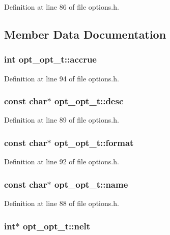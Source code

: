 Definition at line 86 of file options.h.

\subsection{Member Data Documentation}
\subsubsection[{accrue}]{\setlength{\rightskip}{0pt plus 5cm}int {\bf opt\_\-opt\_\-t::accrue}}\label{structopt__opt__t_1e4f71c9392ad7eee4603ad7ce7fe5a0}




Definition at line 94 of file options.h.
\subsubsection[{desc}]{\setlength{\rightskip}{0pt plus 5cm}const char$\ast$ {\bf opt\_\-opt\_\-t::desc}}\label{structopt__opt__t_8f7d53f1fe3aeb96745275446dc5406c}




Definition at line 89 of file options.h.
\subsubsection[{format}]{\setlength{\rightskip}{0pt plus 5cm}const char$\ast$ {\bf opt\_\-opt\_\-t::format}}\label{structopt__opt__t_b91762ff050fe1164dcd1cccc55efb67}




Definition at line 92 of file options.h.
\subsubsection[{name}]{\setlength{\rightskip}{0pt plus 5cm}const char$\ast$ {\bf opt\_\-opt\_\-t::name}}\label{structopt__opt__t_f3e4b9a7e93b947ec1663a98d787cd84}




Definition at line 88 of file options.h.
\subsubsection[{nelt}]{\setlength{\rightskip}{0pt plus 5cm}int$\ast$ {\bf opt\_\-opt\_\-t::nelt}}\label{structopt__opt__t_85c8a493dba452cb185f8a6a01f3ac68}




